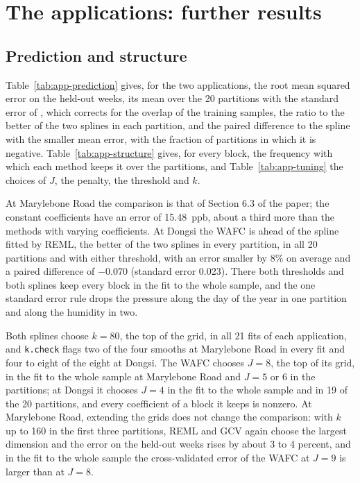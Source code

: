 \documentclass[10pt]{book}
\theoremstyle{definition}
\begin{document}
{\color{colR1}
\section{The applications: further results}
\label{sec:supp-app}

\subsection*{Prediction and structure}

Table~\ref{tab:app-prediction} gives, for the two applications, the root mean
squared error on the held-out weeks, its mean over the 20 partitions with the
standard error of \citet{Nadeau-Bengio-2003}, which corrects for the overlap
of the training samples, the ratio to the better of the two splines in each
partition, and the paired difference to the spline with the smaller mean
error, with the fraction of partitions in which it is negative.
Table~\ref{tab:app-structure} gives, for every block, the frequency with
which each method keeps it over the partitions, and
Table~\ref{tab:app-tuning} the choices of $J$, the penalty, the threshold
and $k$.

At Marylebone Road the comparison is that of Section 6.3 of the paper; the
constant coefficients have an error of 15.48~ppb, about a third more than
the methods with varying coefficients. At Dongsi the WAFC is ahead of the
spline fitted by REML, the better of the two splines in every partition, in
all 20 partitions and with either threshold, with an error smaller by 8\% on
average and a paired difference of $-0.070$ (standard error 0.023). There
both thresholds and both splines keep every block in the fit to the whole
sample, and the one standard error rule drops the pressure along the day of
the year in one partition and along the humidity in two.

Both splines choose $k = 80$, the top of the grid, in all 21 fits of each
application, and \texttt{k.check} flags two of the four smooths at
Marylebone Road in every fit and four to eight of the eight at Dongsi. The
WAFC chooses $J = 8$, the top of its grid, in the fit to the whole sample at
Marylebone Road and $J = 5$ or 6 in the partitions; at Dongsi it chooses
$J = 4$ in the fit to the whole sample and in 19 of the 20 partitions, and
every coefficient of a block it keeps is nonzero. At Marylebone Road,
extending the grids does not change the comparison: with $k$ up to 160 in
the first three partitions, REML and GCV again choose the largest dimension
and the error on the held-out weeks rises by about 3 to 4 percent, and in the
fit to the whole sample the cross-validated error of the WAFC at $J = 9$ is
larger than at $J = 8$.

}
\end{document}
